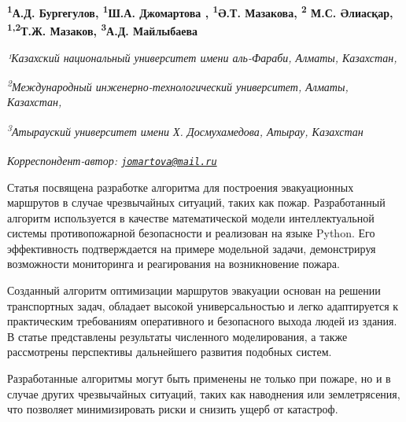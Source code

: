 
\begin{articleheader}

{\bfseries \textsuperscript{1}А.Д. Бургегулов,
\textsuperscript{1}Ш.А. Джомартова\textsuperscript{\envelope } ,
\textsuperscript{1}Ә.Т. Мазакова,
\textsuperscript{2} М.С. Әлиасқар,
\textsuperscript{1,2}Т.Ж. Мазаков,
\textsuperscript{3}А.Д. Майлыбаева}
\end{articleheader}

\begin{affiliation}
\emph{¹Казахский национальный университет имени аль-Фараби, Алматы, Казахстан,}

\emph{\textsuperscript{2}Международный инженерно-технологический университет, Алматы, Казахстан,}

\emph{\textsuperscript{3}Атырауский университет имени Х. Досмухамедова, Атырау, Казахстан}

\raggedright \textsuperscript{\envelope }{\em Корреспондент-автор: \href{mailto:jomartova@mail.ru}{\nolinkurl{jomartova@mail.ru}}}
\end{affiliation}

Статья посвящена разработке алгоритма для построения эвакуационных
маршрутов в случае чрезвычайных ситуаций, таких как пожар. Разработанный
алгоритм используется в качестве математической модели интеллектуальной
системы противопожарной безопасности и реализован на языке Python. Его
эффективность подтверждается на примере модельной задачи, демонстрируя
возможности мониторинга и реагирования на возникновение пожара.

Созданный алгоритм оптимизации маршрутов эвакуации основан на решении
транспортных задач, обладает высокой универсальностью и легко
адаптируется к практическим требованиям оперативного и безопасного
выхода людей из здания. В статье представлены результаты численного
моделирования, а также рассмотрены перспективы дальнейшего развития
подобных систем.

Разработанные алгоритмы могут быть применены не только при пожаре, но и
в случае других чрезвычайных ситуаций, таких как наводнения или
землетрясения, что позволяет минимизировать риски и снизить ущерб от
катастроф.

